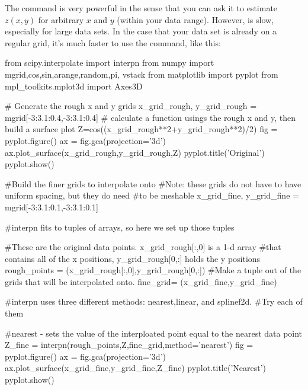 The  command is very powerful in the sense
that you can ask it to estimate $z(x,y)$ for arbitrary $x$ and $y$ (within
your data range).  However,  is slow, especially for large data sets.  In the case that your data set is already on a regular grid, it's much faster to
use the  command, like this:
\begin{codeexample}
\begin{VerbatimOut}{\listingFile}
from scipy.interpolate import interpn
from numpy import mgrid,cos,sin,arange,random,pi, vstack
from matplotlib import pyplot
from mpl_toolkits.mplot3d import Axes3D

# Generate the rough x and y grids
x_grid_rough, y_grid_rough = mgrid[-3:3.1:0.4,-3:3.1:0.4]
# calculate a function usings the rough x and y, then build a surface plot
Z=cos((x_grid_rough**2+y_grid_rough**2)/2)
fig = pyplot.figure()
ax = fig.gca(projection='3d')
ax.plot_surface(x_grid_rough,y_grid_rough,Z)
pyplot.title('Original')
pyplot.show()

#Build the finer grids to interpolate onto
#Note: these grids do not have to have uniform spacing, but they do need
#to be meshable
x_grid_fine, y_grid_fine = mgrid[-3:3.1:0.1,-3:3.1:0.1]

#interpn fits to tuples of arrays, so here we set up those tuples

#These are the original data points.  x_grid_rough[:,0] is a 1-d array
#that contains all of the x positions, y_grid_rough[0,:] holds the y positions
rough_points = (x_grid_rough[:,0],y_grid_rough[0,:])
#Make a tuple out of the grids that will be interpolated onto.
fine_grid= (x_grid_fine,y_grid_fine)

#interpn uses three different methods: nearest,linear, and splinef2d.
#Try each of them


#nearest - sets the value of the interploated point equal to the nearest data point
Z_fine = interpn(rough_points,Z,fine_grid,method='nearest')
fig = pyplot.figure()
ax = fig.gca(projection='3d')
ax.plot_surface(x_grid_fine,y_grid_fine,Z_fine)
pyplot.title('Nearest')
pyplot.show()


\end{VerbatimOut}
\end{codeexample}
